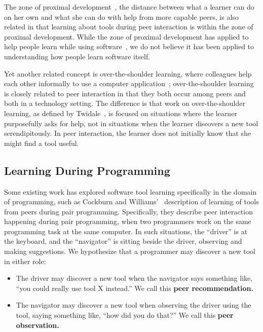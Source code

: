 \documentclass[smallextended]{svjour3}
\newcommand\discovery{peer interaction\xspace}
\newcommand\discpush{peer recommendation\xspace}
\newcommand\discpull{peer observation\xspace}
\begin{document}
The zone of proximal development~\citep{vygotsky}, the distance between
what a learner can do on her own and what she can do with help from
more capable peers, is also related in that learning about tools during
\discovery is within the zone of proximal development.
While the zone of proximal development has applied to help people learn
while using software~\citep{borthick,crook,luckin},
we do not believe it has been applied to understanding how people
learn software itself.


Yet another related concept is over-the-shoulder learning, where colleagues help
each other informally to use a computer application~\citep{twidale05}; 
over-the-shoulder learning is closely related to \discovery in that
they both occur among peers and both in a technology setting.
The difference is that work on over-the-shoulder learning, as 
defined by Twidale~\citeyearpar{twidale05}, is focused on situations where the learner purposefully asks for help,
not in situations when the learner discovers a new tool serendipitously.
In \discovery, the learner does not initially know that she might find a tool
useful.

\subsection{Learning During Programming}

Some existing work has explored software tool learning specifically in the domain
of programming, such as Cockburn and Williams'~\citeyearpar{cockburn00} description
of learning of tools from peers during pair programming.
Specifically, they describe \discovery happening during pair programming, 
when two programmers work on the same programming task at the same computer.
In such situations, the ``driver'' is at the keyboard, and the ``navigator'' is
sitting beside the driver, observing and making suggestions.
We hypothesize that a programmer may discover a new tool in either role:
\begin{itemize}
\item
The driver may discover a new tool when the navigator says 
something like, ``you could really use tool X instead.'' 
We call this \textbf{\discpush.}
\item
The navigator may discover a new tool when observing the driver using the tool,
saying something like, ``how did you do that?'' 
We call this \textbf{\discpull.}
\end{itemize}
\end{document}
